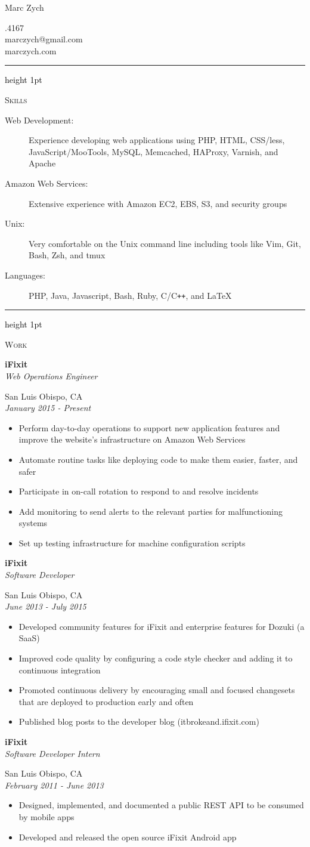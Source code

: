 \documentclass[letterpaper,10pt]{article}
\newcommand{\resauthor}[4]{
   \begin{minipage}[c]{.4\textwidth}
      \raggedright
      {\Huge #1}
   \end{minipage}
   \hfill
   \begin{minipage}[c]{.4\textwidth}
      \raggedleft
      #2\\
      #3\\
      #4
   \end{minipage}
}
\newcommand{\ressectiondivider}{
   \textcolor{black}{\hrule height 1pt}
}
\newcommand{\resitem}[1]{\item #1 \vspace{-2pt}}
\newcommand{\ressubheading}[4]{
   \begin{minipage}[t]{10cm}
      \flushleft
      \large{\textbf{#1}}\\
      \normalsize{\textit{#3}}\\
   \end{minipage}
   \hfill
   \begin{minipage}[t]{5cm}
      \flushright
      #2\\
      \textit{#4}\\
   \end{minipage}
}
\newenvironment{ressection}[1]{
   \vspace{12pt}
   \ressectiondivider
   \vspace{5pt}
   \begin{minipage}[t]{2.75cm}
      \flushleft
      \Large{\textrm{\textsc{#1}}}
   \end{minipage}
   \hfill
   \begin{minipage}[t]{16cm}
      \flushleft
}{
   \end{minipage}
}
\begin{document}
\resauthor{Marc Zych}{805.217.4167}{marczych@gmail.com}{marczych.com}

\begin{ressection}{Skills}
   \begin{description}
      \item[Web Development:]
      Experience developing web applications using PHP, HTML, CSS/less, JavaScript/MooTools, MySQL, Memcached, HAProxy, Varnish, and Apache
      \item[Amazon Web Services:]
      Extensive experience with Amazon EC2, EBS, S3, and security groups
      \item[Unix:]
      Very comfortable on the Unix command line including tools like Vim, Git, Bash, Zsh, and tmux
      \item[Languages:]
      PHP, Java, Javascript, Bash, Ruby, C/C{}\verb!++!, and \LaTeX
   \end{description}
\end{ressection}

\begin{ressection}{Work}
   \ressubheading{iFixit}{San Luis Obispo, CA}{Web Operations Engineer}{January 2015 - Present}
   \begin{itemize}
      \resitem{Perform day-to-day operations to support new application features and improve the website's infrastructure on Amazon Web Services}
      \resitem{Automate routine tasks like deploying code to make them easier, faster, and safer}
      \resitem{Participate in on-call rotation to respond to and resolve incidents}
      \resitem{Add monitoring to send alerts to the relevant parties for malfunctioning systems}
      \resitem{Set up testing infrastructure for machine configuration scripts}
   \end{itemize}
   \ressubheading{iFixit}{San Luis Obispo, CA}{Software Developer}{June 2013 - July 2015}
   \begin{itemize}
      \resitem{Developed community features for iFixit and enterprise features for Dozuki (a SaaS)}
      \resitem{Improved code quality by configuring a code style checker and adding it to continuous integration}
      \resitem{Promoted continuous delivery by encouraging small and focused changesets that are deployed to production early and often}
      \resitem{Published blog posts to the developer blog (itbrokeand.ifixit.com)}
   \end{itemize}
   \ressubheading{iFixit}{San Luis Obispo, CA}{Software Developer Intern}{February 2011 - June 2013}
   \begin{itemize}
      \resitem{Designed, implemented, and documented a public REST API to be consumed by mobile apps}
      \resitem{Developed and released the open source iFixit Android app}
   \end{itemize}
\end{ressection}
\end{document}
